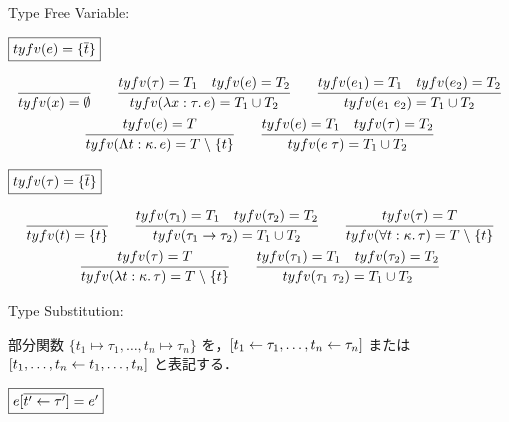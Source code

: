 Type Free Variable:

$\fbox{$\mathop{tyfv}(e) = \{\overline{t}\}$}$

\begin{gather*}
  \infer{\typefreevar(x) = \emptyset}{}
  \hspace{2em}
  \infer{\typefreevar(\lambda x: \tau\ldotp e) = T_1 \cup T_2}{
    \typefreevar(\tau) = T_1
    &
    \typefreevar(e) = T_2
  }
  \hspace{2em}
  \infer{\typefreevar(e_1\; e_2) = T_1 \cup T_2}{
    \typefreevar(e_1) = T_1
    &
    \typefreevar(e_2) = T_2
  }
  \\
  \infer{\typefreevar(\Lambda t: \kappa\ldotp e) = T \rcomplement \{t\}}{
    \typefreevar(e) = T
  }
  \hspace{2em}
  \infer{\typefreevar(e\; \tau) = T_1 \cup T_2}{
    \typefreevar(e) = T_1
    &
    \typefreevar(\tau) = T_2
  }
\end{gather*}

$\fbox{$\mathop{tyfv}(\tau) = \{\overline{t}\}$}$

\begin{gather*}
  \infer{\typefreevar(t) = \{t\}}{}
  \hspace{2em}
  \infer{\typefreevar(\tau_1 \to \tau_2) = T_1 \cup T_2}{
    \typefreevar(\tau_1) = T_1
    &
    \typefreevar(\tau_2) = T_2
  }
  \hspace{2em}
  \infer{\typefreevar(\forall t: \kappa\ldotp \tau) = T \rcomplement \{t\}}{
    \typefreevar(\tau) = T
  }
  \\
  \infer{\typefreevar(\lambda t: \kappa\ldotp \tau) = T \rcomplement \{t\}}{
    \typefreevar(\tau) = T
  }
  \hspace{2em}
  \infer{\typefreevar(\tau_1\; \tau_2) = T_1 \cup T_2}{
    \typefreevar(\tau_1) = T_1
    &
    \typefreevar(\tau_2) = T_2
  }
\end{gather*}

Type Substitution:

部分関数 $\{t_1 \mapsto \tau_1, \ldots, t_n \mapsto \tau_n\}$ を，$[t_1 \gets \tau_1, \ldots, t_n \gets \tau_n]$ または $[t_1, \ldots, t_n \gets t_1, \ldots, t_n]$ と表記する．

$\fbox{$e[\overline{t' \gets \tau'}] = e'$}$


